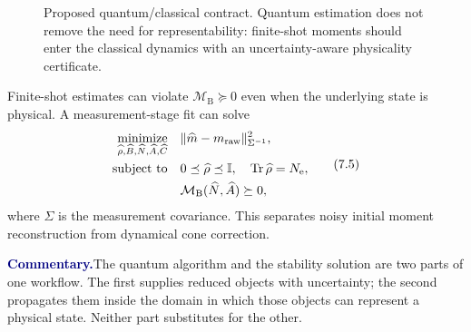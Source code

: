 \documentclass[10pt]{article}
\newcommand{\Tr}{\operatorname{Tr}}
\newcommand{\I}{\mathbb I}
\newcommand{\MB}{\mathcal M_{\mathrm B}}
\newcommand{\pedbox}[2]{%
  \par\medskip
  \noindent\colorbox{pale}{%
    \parbox{\dimexpr\linewidth-2\fboxsep\relax}{%
      \textcolor{navy}{\textbf{#1}}\quad #2%
    }%
  }\par\medskip
}
\newcommand{\commentarybox}[1]{\pedbox{Commentary.}{#1}}
\begin{document}
\begin{figure}[t]
\centering
{}
\caption{Proposed quantum/classical contract.  Quantum estimation does not
remove the need for representability: finite-shot moments should enter the
classical dynamics with an uncertainty-aware physicality certificate.}
\label{fig:quantum}
\end{figure}

Finite-shot estimates can violate \(\MB\succeq0\) even when the underlying
state is physical.  A measurement-stage fit can solve
\[
\begin{aligned}
\underset{\widehat\rho,\widehat B,\widehat N,\widehat A,\widehat C}
{\text{minimize}}\quad&
\lVert \widehat m-m_{\rm raw}\rVert_{\Sigma^{-1}}^2,\\
\text{subject to}\quad&
0\preceq\widehat\rho\preceq\I,\quad
\Tr\widehat\rho=N_{\rm e},\\
&
\MB(\widehat N,\widehat A)\succeq0,
\end{aligned}
\tag{7.5}
\]
where \(\Sigma\) is the measurement covariance.  This separates noisy initial
moment reconstruction from dynamical cone correction.

\commentarybox{The quantum algorithm and the stability solution are two parts
of one workflow.  The first supplies reduced objects with uncertainty; the
second propagates them inside the domain in which those objects can represent
a physical state.  Neither part substitutes for the other.}
\end{document}
